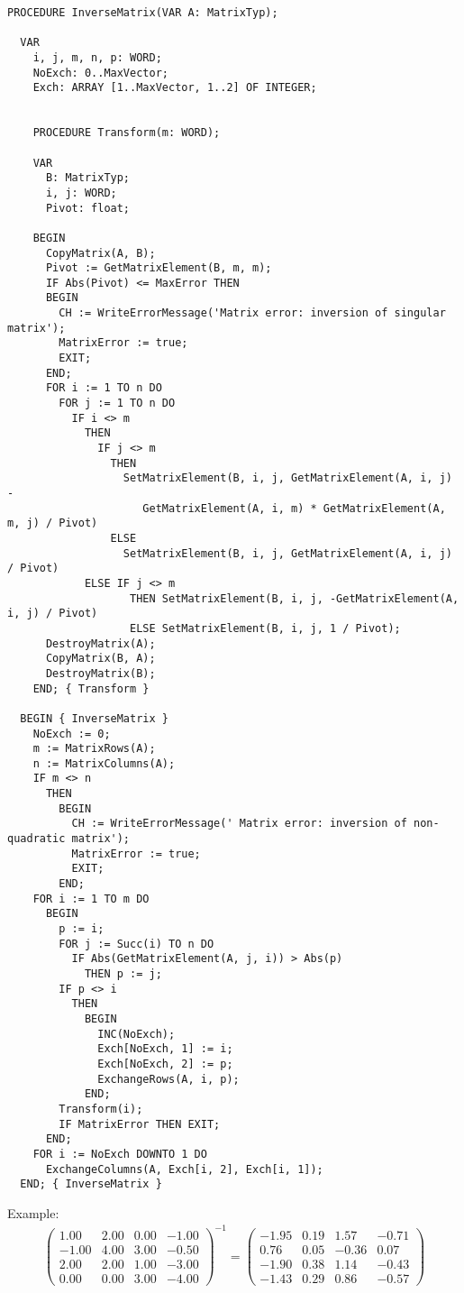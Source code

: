 \begin{refsection}
\begin{lstlisting}[caption=Inverse of a matrix]
  PROCEDURE InverseMatrix(VAR A: MatrixTyp);

  VAR
    i, j, m, n, p: WORD;
    NoExch: 0..MaxVector;
    Exch: ARRAY [1..MaxVector, 1..2] OF INTEGER;


    PROCEDURE Transform(m: WORD);

    VAR
      B: MatrixTyp;
      i, j: WORD;
      Pivot: float;

    BEGIN
      CopyMatrix(A, B);
      Pivot := GetMatrixElement(B, m, m);
      IF Abs(Pivot) <= MaxError THEN
      BEGIN
        CH := WriteErrorMessage('Matrix error: inversion of singular matrix');
        MatrixError := true;
        EXIT;
      END;
      FOR i := 1 TO n DO
        FOR j := 1 TO n DO
          IF i <> m
            THEN
              IF j <> m
                THEN
                  SetMatrixElement(B, i, j, GetMatrixElement(A, i, j) -
                     GetMatrixElement(A, i, m) * GetMatrixElement(A, m, j) / Pivot)
                ELSE
                  SetMatrixElement(B, i, j, GetMatrixElement(A, i, j) / Pivot)
            ELSE IF j <> m
                   THEN SetMatrixElement(B, i, j, -GetMatrixElement(A, i, j) / Pivot)
                   ELSE SetMatrixElement(B, i, j, 1 / Pivot);
      DestroyMatrix(A);
      CopyMatrix(B, A);
      DestroyMatrix(B);
    END; { Transform }

  BEGIN { InverseMatrix }
    NoExch := 0;
    m := MatrixRows(A);
    n := MatrixColumns(A);
    IF m <> n
      THEN
        BEGIN
          CH := WriteErrorMessage(' Matrix error: inversion of non-quadratic matrix');
          MatrixError := true;
          EXIT;
        END;
    FOR i := 1 TO m DO
      BEGIN
        p := i;
        FOR j := Succ(i) TO n DO
          IF Abs(GetMatrixElement(A, j, i)) > Abs(p)
            THEN p := j;
        IF p <> i
          THEN
            BEGIN
              INC(NoExch);
              Exch[NoExch, 1] := i;
              Exch[NoExch, 2] := p;
              ExchangeRows(A, i, p);
            END;
        Transform(i);
        IF MatrixError THEN EXIT;
      END;
    FOR i := NoExch DOWNTO 1 DO
      ExchangeColumns(A, Exch[i, 2], Exch[i, 1]);
  END; { InverseMatrix }
\end{lstlisting}

Example:
\begin{gather}
   \begin{pmatrix}
      1.00 & 2.00 & 0.00 & -1.00 \\
     -1.00 & 4.00 & 3.00 & -0.50 \\
      2.00 & 2.00 & 1.00 & -3.00 \\
      0.00 & 0.00 & 3.00 & -4.00
   \end{pmatrix}^{-1} =
   \begin{pmatrix}
     -1.95 & 0.19 &  1.57 & -0.71 \\
      0.76 & 0.05 & -0.36 &  0.07 \\
     -1.90 & 0.38 &  1.14 & -0.43 \\
     -1.43 & 0.29 &  0.86 & -0.57
   \end{pmatrix}
\end{gather}


\end{refsection}
